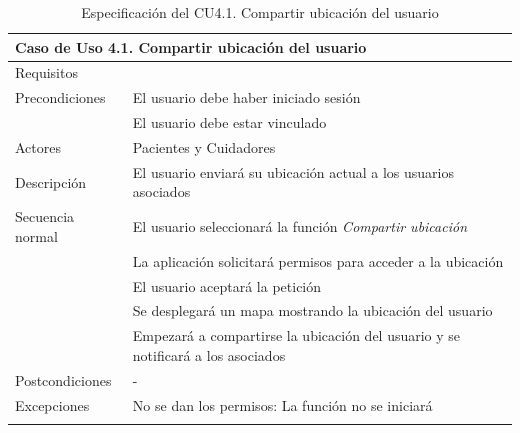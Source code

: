 \begin{longtable}{|p{} p{}|}
    \hline
    \multicolumn{2}{|l|}{\textbf{Caso de Uso 4.1. Compartir ubicación del usuario}} \\ \hline \hline
    Requisitos          & {req:compartir_ubicacion} \\ \hline
    Precondiciones      & El usuario debe haber iniciado sesión \\
                        & El usuario debe estar vinculado \\ \hline
    Actores             & Pacientes y Cuidadores \\ \hline
    Descripción         & El usuario enviará su ubicación actual a los usuarios asociados \\ \hline
    Secuencia normal    & El usuario seleccionará la función \emph{Compartir ubicación} \\
                        & La aplicación solicitará permisos para acceder a la ubicación \\
                        & El usuario aceptará la petición \\
                        & Se desplegará un mapa mostrando la ubicación del usuario \\
                        & Empezará a compartirse la ubicación del usuario y se notificará a los asociados \\ \hline
    Postcondiciones     & - \\ \hline
    Excepciones         & No se dan los permisos: La función no se iniciará \\ \hline
    \caption{Especificación del CU4.1. Compartir ubicación del usuario}
    \label{cu:compartir_ubicacion}
\end{longtable}

